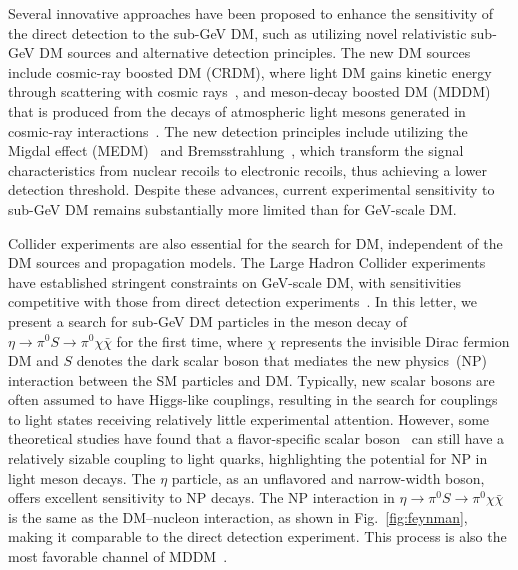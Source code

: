 \documentclass[
 reprint,
 amsmath,amssymb,a
 aps,
 twocolumn
]{revtex4-2}
\begin{document}
Several innovative approaches have been proposed to enhance the sensitivity of the direct detection to the sub-GeV DM, such as utilizing novel relativistic sub-GeV DM sources and  alternative detection principles.
The new DM sources include cosmic-ray boosted DM (CRDM), where light DM gains kinetic energy through scattering with cosmic rays~\cite{Bringmann:2018cvk,Bondarenko:2019vrb,Ge:2020yuf,Cappiello:2019qsw,PROSPECT:2021awi,PandaX-II:2021kai,CDEX:2022fig,LZ:2025iaw}, and meson-decay boosted DM (MDDM) that is produced from the decays of atmospheric light mesons generated in cosmic-ray interactions~\cite{Alvey:2019zaa,Flambaum:2020xxo,Su:2022wpj,PandaX:2023tfq}.
The new detection principles include utilizing the Migdal effect (MEDM)~\cite{migdal1941ionization,Ibe:2017yqa,XENON:2019zpr,SENSEI:2020dpa,DarkSide:2022dhx,PandaX:2023xgl,SENSEI:2023zdf} and Bremsstrahlung~\cite{Kouvaris:2016afs,XENON:2019zpr}, which transform the signal characteristics from nuclear recoils to electronic recoils, thus achieving a lower detection threshold.
Despite these advances, current experimental sensitivity to sub-GeV DM remains substantially more limited than for GeV-scale DM.

Collider experiments are also essential for the search for DM, independent of the DM sources and propagation models.
The Large Hadron Collider experiments have established stringent constraints on GeV-scale DM, with sensitivities competitive with those from direct detection experiments~\cite{DeRoeck:2024fjq,ATLAS:2024kpy}.
In this letter, we present a search for sub-GeV DM particles in the meson decay of $\eta\to\pi^0S\to\pi^0\chi\bar{\chi}$ for the first time, where $\chi$ represents the invisible Dirac fermion DM and $S$ denotes the dark scalar boson that mediates the new physics~(NP) interaction between the SM particles and DM.
Typically, new scalar bosons are often assumed to have Higgs-like couplings, resulting in the search for couplings to light states receiving relatively little experimental attention. However, some theoretical studies have found that a flavor-specific scalar boson~\cite{Batell:2018fqo,Delaunay:2025lhl,Batell:2017kty,Batell:2021xsi} can still have a relatively sizable coupling to light quarks, highlighting the potential for NP in light meson decays.
The $\eta$ particle, as an unflavored and narrow-width boson, offers excellent sensitivity to NP decays. The NP interaction in $\eta\to\pi^0S\to\pi^0\chi\bar{\chi}$ is the same as the DM--nucleon interaction, as shown in Fig.~\ref{fig:feynman}, making it comparable to the direct detection experiment. This process is also the most favorable channel of MDDM~\cite{Alvey:2019zaa,Flambaum:2020xxo,Su:2022wpj,PandaX:2023tfq}.
\end{document}
